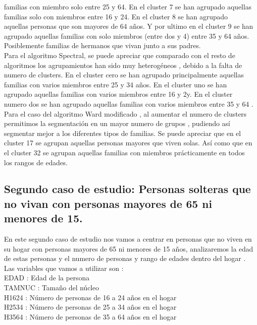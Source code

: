 	familias con miembro solo entre 25 y 64. En el cluster 7 se han agrupado aquellas familias solo con miembros entre 16 y 24.
	En el cluster 8 se han agrupado aquellas personas que son mayores de 64 años. Y por ultimo en el cluster 9 se han 
	agrupado aquellas familias con solo miembros (entre dos y 4) entre 35 y 64 años. Posiblemente familias de hermanos que vivan junto
	a sus padres. \\
	Para el algoritmo Spectral, se puede apreciar que comparado con el resto de algoritmos 
	los agrupamientos han sido muy heterogéneos , debido a la falta de numero de clusters. En el cluster cero se han agrupado 
	principalmente aquellas familias con varios miembros entre 25 y 34 años. En el cluster uno se han agrupado aquellas 
	familias con varios miembros entre 16 y 2y. En el cluster numero dos se han agrupado aquellas familias con varios miembros
	entre 35 y 64 .
	Para el caso del algoritmo Ward modificado , al aumentar el numero de clusters permitimos la segmentación en un mayor numero 
	de grupos , pudiendo así segmentar mejor a los diferentes tipos de familias. Se puede apreciar que en el cluster 17 se agrupan 
	aquellas personas mayores que viven solas. Así como que en el cluster 32 se agrupan aquellas familias con miembros prácticamente
	en todos los rangos de edades. \\

	
	\subsection[Caso de estudio 2. Personas solteras que no vivan con personas mayores de 65 ni menores de 15.]{Segundo caso de estudio: Personas solteras que no vivan con personas mayores de 65 ni menores de 15.}

	En este segundo caso de estudio nos vamos a centrar en personas que no viven en su hogar con personas mayores de 65 ni menores de 15 años, 
	analizaremos la edad de estas personas y el numero de personas y rango de edades dentro del hogar .
	Las variables que vamos a utilizar son : \\

	EDAD  : Edad de la persona  \\   
	TAMNUC : Tamaño del núcleo \\
	H1624 : Número de personas de 16 a 24 años en el hogar  \\
	H2534  : Número de personas de 25 a 34 años en el hogar \\
	H3564 : Número de personas de 35 a 64 años en el hogar   \\

